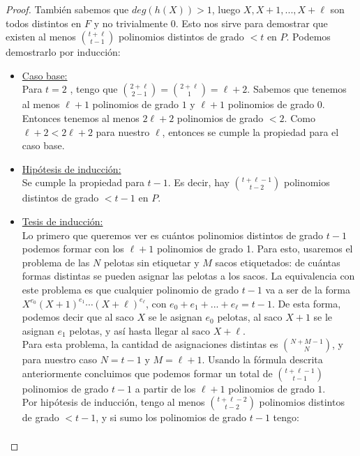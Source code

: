 \documentclass[10pt]{article}
\newcommand{\0}{\mathbf{0}}
\newcommand{\1}{\mathbf{1}}
\newcommand{\+}{\oplus}
\newcommand{\comentario}[1]{}
\theoremstyle{remark}
\theoremstyle{remark}
\begin{document}
\begin{proof}
		También sabemos que $deg(h(X))>1$, luego $X,X+1,...,X+\ell $ son todos distintos en $F$ y no trivialmente $0$\comentario{Que no sea trivialmente 0 no se si nos sirve, ya que son de grado $1<t$ ($O_r(p)\leq t$), entonces como son distintos en $P$ seran distintos en $\mathcal{G}$}. Esto nos sirve para demostrar que existen al menos ${t+\ell }\choose{t-1}$ polinomios distintos de grado $<t$ en $P$. Podemos demostrarlo por inducción:
		\begin{itemize}
			\item \underline{Caso base:}\\
			Para $t=2$ \comentario{También funciona para $t=1$}, tengo que ${{2+\ell }\choose{2-1}}={{2+\ell }\choose{1}}=\ell +2$. Sabemos que tenemos al menos $\ell +1$ polinomios de grado $1$ y $\ell +1$ polinomios de grado 0. Entonces tenemos al menos $2\ell +2$ polinomios de grado $<2$. Como $\ell +2< 2\ell +2$ para nuestro $\ell $, entonces se cumple la propiedad para el caso base.
			\item \underline{Hipótesis de inducción:}\\
			Se cumple la propiedad para $t-1$. Es decir, hay ${{t+\ell -1}\choose{t-2}}$ polinomios distintos de grado $<t-1$ en $P$.
			\item \underline{Tesis de inducción:}\\
			Lo primero que queremos ver es cuántos polinomios distintos de grado $t-1$ podemos formar con los $\ell +1$ polinomios de grado 1. Para esto, usaremos el problema de las $N$ pelotas sin etiquetar y $M$ sacos etiquetados: de cuántas formas distintas se pueden asignar las pelotas a los sacos. La equivalencia con este problema es que cualquier polinomio de grado $t-1$ va a ser de la forma $X^{e_0}(X+1)^{e_1}\cdots(X+\ell )^{e_\ell }$, con $e_0+e_1+...+e_\ell =t-1$. De esta forma, podemos decir que al saco $X$ se le asignan $e_0$ pelotas, al saco $X+1$ se le asignan $e_1$ pelotas, y así­ hasta llegar al saco $X+\ell $.\\
			Para esta problema, la cantidad de asignaciones distintas es ${{N+M-1}\choose{N}}$, y para nuestro caso $N=t-1$ y $M=\ell +1$. Usando la fórmula descrita anteriormente concluimos que podemos formar un total de ${{t+\ell -1}\choose{t-1}}$ polinomios de grado $t-1$ a partir de los $\ell +1$ polinomios de grado $1$.\\
			Por hipótesis de inducción, tengo al menos ${{t+\ell -2}\choose{t-2}}$ polinomios distintos de grado $<t-1$, y si sumo los polinomios de grado $t-1$ tengo:
			\begin{eqnarray}

\end{eqnarray}
\end{itemize}
\end{proof}
\end{document}
